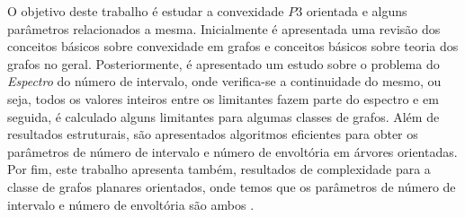 O objetivo deste trabalho é estudar a convexidade $P3$ orientada e alguns parâmetros relacionados a mesma. Inicialmente é apresentada uma revisão dos conceitos básicos sobre convexidade em grafos e conceitos básicos sobre teoria dos grafos no geral. Posteriormente, é apresentado um estudo sobre o problema do \emph{Espectro} do número de intervalo, onde verifica-se a continuidade do mesmo, ou seja, todos os valores inteiros entre os limitantes fazem parte do espectro e em seguida, é calculado alguns limitantes para algumas classes de grafos. Além de resultados estruturais, são apresentados algoritmos eficientes para obter os parâmetros de número de intervalo e número de envoltória em árvores orientadas. Por fim, este trabalho apresenta também, resultados de complexidade para a classe de grafos planares orientados, onde temos que os parâmetros de número de intervalo e número de envoltória são ambos \npcs.

